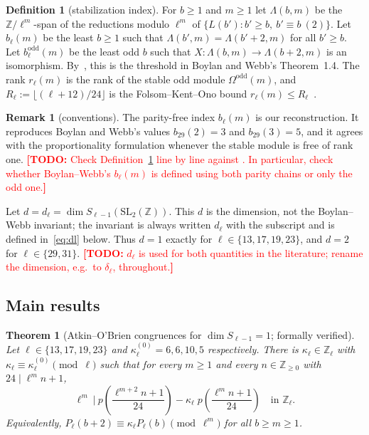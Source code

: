 \documentclass[11pt]{amsart}
\newcommand{\Z}{\mathbb{Z}}
\newcommand{\Zl}{\mathbb{Z}_\ell}
\newcommand{\SL}{\mathrm{SL}_2(\Z)}
\newcommand{\TODO}[1]{\textcolor{red}{\textbf{[TODO:} #1\textbf{]}}}
\theoremstyle{plain}
\newtheorem{mainthm}{Theorem}
\theoremstyle{definition}
\newtheorem{definition}[theorem]{Definition}
\newtheorem{remark}[theorem]{Remark}
\numberwithin{equation}{section}
\begin{document}
\begin{definition}[stabilization index]\label{def:b}
For $b\ge1$ and $m\ge1$ let $\Lambda(b,m)$ be the $\Z/\ell^m$-span of the reductions modulo $\ell^m$ of
$\{L(b'):b'\ge b,\ b'\equiv b\ (2)\}$. Let $b_\ell(m)$ be the least $b\ge 1$ such that $\Lambda(b',m)=\Lambda(b'+2,m)$
for all $b'\ge b$. Let $b^{\mathrm{odd}}_\ell(m)$ be the least odd $b$ such that $X:\Lambda(b,m)\to\Lambda(b+2,m)$ is an
isomorphism. By~\cite[Remark~1]{BoylanWebb2013}, this is the threshold in Boylan and Webb's Theorem~1.4.
The rank $r_\ell(m)$ is the rank of the stable odd module $\Omega^{\mathrm{odd}}(m)$, and
$R_\ell:=\lfloor(\ell+12)/24\rfloor$ is the Folsom--Kent--Ono bound $r_\ell(m)\le R_\ell$~\cite[(1.13)]{BoylanWebb2013}.
\end{definition}

\begin{remark}[conventions]\label{rem:conventions}
The parity-free index $b_\ell(m)$ is our reconstruction. It reproduces Boylan and Webb's values $b_{29}(2)=3$ and
$b_{29}(3)=5$, and it agrees with the proportionality formulation whenever the stable module is free of rank one.
\TODO{Check Definition~\ref{def:b} line by line against \cite[\S1, Thm.~1.4 and Remark~1]{BoylanWebb2013}. In particular,
check whether Boylan--Webb's $b_\ell(m)$ is defined using both parity chains or only the odd one.}
\end{remark}

Let $d=d_\ell=\dim S_{\ell-1}(\SL)$. This $d$ is the dimension, not the Boylan--Webb invariant; the invariant is always
written $d_\ell$ with the subscript and is defined in~\eqref{eq:dl} below. Thus $d=1$ exactly for
$\ell\in\{13,17,19,23\}$, and $d=2$ for $\ell\in\{29,31\}$.
\TODO{$d_\ell$ is used for both quantities in the literature; rename the dimension, e.g.\ to $\delta_\ell$, throughout.}

\subsection{Main results}

\begin{mainthm}[Atkin--O'Brien congruences for $\dim S_{\ell-1}=1$; formally verified]\label{thm:A}
Let $\ell\in\{13,17,19,23\}$ and $\kappa^{(0)}_\ell=6,6,10,5$ respectively. There is $\kappa_\ell\in\Zl$ with
$\kappa_\ell\equiv\kappa_\ell^{(0)}\pmod\ell$ such that for every $m\ge1$ and every $n\in\Z_{\ge0}$ with
$24\mid\ell^m n+1$,
\begin{equation}\label{eq:main}
  \ell^m \ \Big|\ p\!\left(\frac{\ell^{m+2}n+1}{24}\right)-\kappa_\ell\; p\!\left(\frac{\ell^{m}n+1}{24}\right)\quad\text{in }\Zl .
\end{equation}
Equivalently, $P_\ell(b+2)\equiv\kappa_\ell P_\ell(b)\pmod{\ell^m}$ for all $b\ge m\ge1$.
\end{mainthm}
\end{document}
